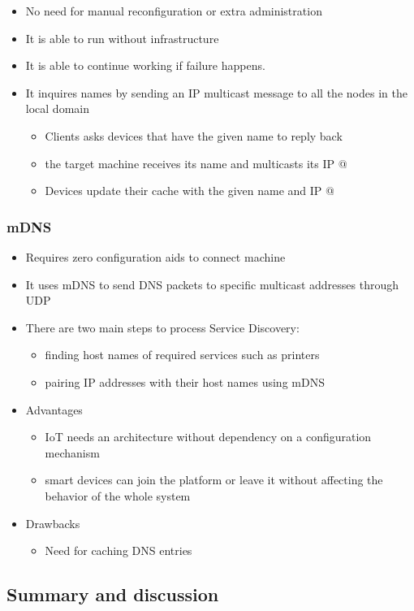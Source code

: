 \begin{itemize}
	\item No need for manual reconfiguration or extra administration
	\item It is able to run without infrastructure
	\item It is able to continue working if failure happens.
	\item It inquires names by sending an IP multicast message to all the nodes in the local domain
	\begin{itemize}
		\item Clients asks devices that have the given name to reply back
		\item the target machine receives its name and multicasts its IP @
		\item Devices update their cache with the given name and IP @
	\end{itemize}
\end{itemize}

\subsubsection{mDNS}

\begin{itemize}
	\item Requires zero configuration aids to connect machine
	\item It uses mDNS to send DNS packets to specific multicast addresses through UDP
	\item There are two main steps to process Service Discovery:
	\begin{itemize}
		\item finding host names of required services such as printers
		\item pairing IP addresses with their host names using mDNS
	\end{itemize}
	\item Advantages
	\begin{itemize}
		\item IoT needs an architecture without dependency on a configuration mechanism
		\item smart devices can join the platform or leave it without affecting the behavior of the whole system
	\end{itemize}
	\item Drawbacks
	\begin{itemize}
		\item Need for caching DNS entries
	\end{itemize}
\end{itemize}


\subsection{Summary and discussion}


